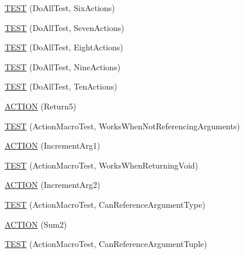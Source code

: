 \begin{DoxyCompactItemize}
\item 
\mbox{\hyperlink{namespacetesting_1_1gmock__generated__actions__test_af9328f486c8862bfb3a08bd9c0b10a2d}{T\+E\+ST}} (Do\+All\+Test, Six\+Actions)
\item 
\mbox{\hyperlink{namespacetesting_1_1gmock__generated__actions__test_aa1eb8dae72fb173011bf64027f075cea}{T\+E\+ST}} (Do\+All\+Test, Seven\+Actions)
\item 
\mbox{\hyperlink{namespacetesting_1_1gmock__generated__actions__test_a7e7ffc936de010908f42193b951016e3}{T\+E\+ST}} (Do\+All\+Test, Eight\+Actions)
\item 
\mbox{\hyperlink{namespacetesting_1_1gmock__generated__actions__test_ae2037cf34f7bbdb2aa779f31f44c0530}{T\+E\+ST}} (Do\+All\+Test, Nine\+Actions)
\item 
\mbox{\hyperlink{namespacetesting_1_1gmock__generated__actions__test_a11cc35bfa98278915c040aac2329b4a7}{T\+E\+ST}} (Do\+All\+Test, Ten\+Actions)
\item 
\mbox{\hyperlink{namespacetesting_1_1gmock__generated__actions__test_a1275b0757e9f1caf70fbc23da141acd3}{A\+C\+T\+I\+ON}} (Return5)
\item 
\mbox{\hyperlink{namespacetesting_1_1gmock__generated__actions__test_a6a73da775945f4294d9377b0110bb237}{T\+E\+ST}} (Action\+Macro\+Test, Works\+When\+Not\+Referencing\+Arguments)
\item 
\mbox{\hyperlink{namespacetesting_1_1gmock__generated__actions__test_a960f5a5ca2b6a95ce1f3f1673b90d02d}{A\+C\+T\+I\+ON}} (Increment\+Arg1)
\item 
\mbox{\hyperlink{namespacetesting_1_1gmock__generated__actions__test_accde1673541c5076b0e09b3f1914c9d2}{T\+E\+ST}} (Action\+Macro\+Test, Works\+When\+Returning\+Void)
\item 
\mbox{\hyperlink{namespacetesting_1_1gmock__generated__actions__test_aa2c56f5c6a770b252ebdc27a6d8b613d}{A\+C\+T\+I\+ON}} (Increment\+Arg2)
\item 
\mbox{\hyperlink{namespacetesting_1_1gmock__generated__actions__test_abdfd8146dfbb5a152326a851b13e45cb}{T\+E\+ST}} (Action\+Macro\+Test, Can\+Reference\+Argument\+Type)
\item 
\mbox{\hyperlink{namespacetesting_1_1gmock__generated__actions__test_a108b4ee75c3b13445b7035fd5ecd6d6d}{A\+C\+T\+I\+ON}} (Sum2)
\item 
\mbox{\hyperlink{namespacetesting_1_1gmock__generated__actions__test_a4e2d8b9ac63b2f6dc6d4b17c3a767dee}{T\+E\+ST}} (Action\+Macro\+Test, Can\+Reference\+Argument\+Tuple)
\item 

\end{DoxyCompactItemize}
